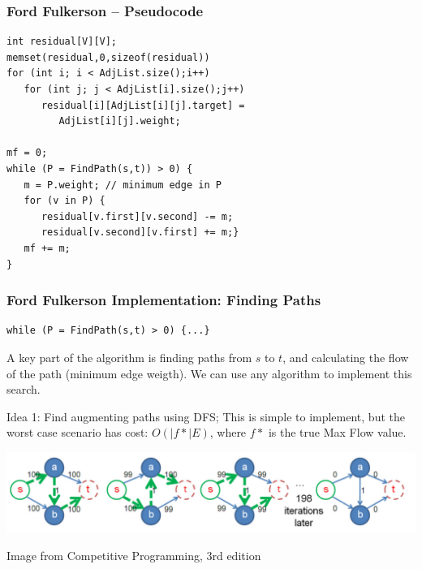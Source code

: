 \documentclass{beamer}
\begin{document}
\begin{frame}
  \frametitle{Ford Fulkerson -- Pseudocode}
{\smaller
  \begin{exampleblock}{}
\begin{verbatim}
int residual[V][V];
memset(residual,0,sizeof(residual))
for (int i; i < AdjList.size();i++)
   for (int j; j < AdjList[i].size();j++)
      residual[i][AdjList[i][j].target] = 
         AdjList[i][j].weight;

mf = 0;
while (P = FindPath(s,t)) > 0) {
   m = P.weight; // minimum edge in P
   for (v in P) {
      residual[v.first][v.second] -= m;
      residual[v.second][v.first] += m;}
   mf += m;
}
\end{verbatim}
  \end{exampleblock}
}
\end{frame}


\begin{frame}
  \frametitle{Ford Fulkerson Implementation: Finding Paths}

  {\smaller
    \begin{block}{}
\begin{verbatim}
while (P = FindPath(s,t) > 0) {...}
\end{verbatim}

A key part of the algorithm is finding paths from $s$ to $t$, and
calculating the flow of the path (minimum edge weigth). We can use any
algorithm to implement this search.
    \end{block}

\begin{exampleblock}{Idea 1: Find augmenting paths using DFS;}
  This is simple to implement, but the worst case scenario has cost:
  $O(|f*|E)$, where $f*$ is the true Max Flow value.

  \includegraphics[width=1\textwidth]{../img/ff_worst_halim}

\end{exampleblock}
}
\hfill{\tiny Image from Competitive Programming, 3rd edition}
\end{frame}
\end{document}
